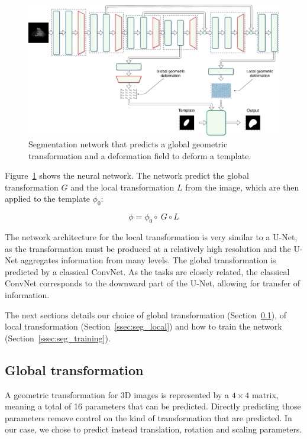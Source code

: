 \begin{figure}[htbp]
	\includegraphics[width=\textwidth]{img_seg/deformation_network}
    \caption{Segmentation network that predicts a global geometric transformation and a deformation field to deform a template.}
    \label{fig:deform_network}
\end{figure}

Figure~\ref{fig:deform_network} shows the neural network. The network predict the global transformation $G$ and the local transformation $L$ from the image, which are then applied to the template $\phi_0$:

\begin{equation}
    \phi = \phi_0 \circ \ G \circ L
\end{equation}

The network architecture for the local transformation is very similar to a U-Net, as the transformation must be produced at a relatively high resolution and the U-Net aggregates information from many levels. The global transformation is predicted by a classical ConvNet. As the tasks are closely related, the classical ConvNet corresponds to the downward part of the U-Net, allowing for transfer of information.

The next sections details our choice of global transformation (Section~\ref{ssec:seg_global}), of local transformation (Section~\ref{ssec:seg_local}) and how to train the network (Section~\ref{ssec:seg_training}).

\subsection{Global transformation}
\label{ssec:seg_global}

A geometric transformation for 3D images is represented by a $4 \times 4$ matrix, meaning a total of 16 parameters that can be predicted. Directly predicting those parameters remove control on the kind of transformation that are predicted. In our case, we chose to predict instead translation, rotation and scaling parameters. 

